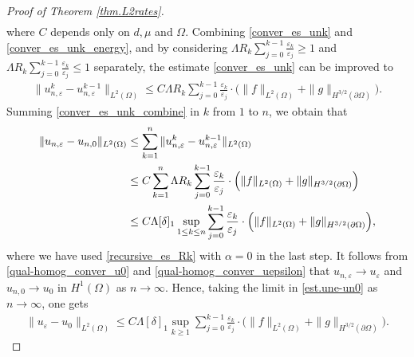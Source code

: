 \documentclass[reqno,12pt]{amsart} %
\theoremstyle{definition}
\theoremstyle{remark}
\numberwithin{equation}{section}
\newcommand{\e}{\varepsilon}
\begin{document}
\begin{proof}[Proof of Theorem \ref{thm.L2rates}]
\begin{align}
\end{align}
where $C$ depends only on $d, \mu $ and $\Omega$. Combining \eqref{conver_es_unk} and \eqref{conver_es_unk_energy}, and by considering $\Lambda R_k\sum_{j=0}^{k-1}\frac{\varepsilon_k}{\varepsilon_j}\geq 1$ and $\Lambda R_k\sum_{j=0}^{k-1}\frac{\varepsilon_k}{\varepsilon_j}\leq 1$ separately, the estimate \eqref{conver_es_unk} can be improved to
\begin{align}\label{conver_es_unk_combine}
  \|u_{n, \varepsilon}^k-u_{n, \varepsilon}^{k-1}\|_{L^2(\Omega)}\leq C\Lambda R_k\sum_{j=0}^{k-1}\frac{\varepsilon_k}{\varepsilon_j}\cdot\Big(\|f\|_{L^2(\Omega)}+\|g\|_{H^{3/2}(\partial\Omega)}\Big).
\end{align}
Summing \eqref{conver_es_unk_combine} in $k$ from $1$ to $n$, we obtain that
\begin{equation}\label{est.une-un0}
\aligned
  \|u_{n,\varepsilon}-u_{n, 0}\|_{L^2(\Omega)}&\leq \sum_{k=1}^n\|u_{n, \varepsilon}^k-u_{n, \varepsilon}^{k-1}\|_{L^2(\Omega)}\\&\leq C\sum_{k=1}^n \Lambda R_k\sum_{j=0}^{k-1}\frac{\varepsilon_k}{\varepsilon_j}\cdot\Big(\|f\|_{L^2(\Omega)}+\|g\|_{H^{3/2}(\partial\Omega)}\Big)\\&\leq C \Lambda[\delta]_1\sup_{1\le k\le n} \sum_{j = 0}^{k-1} \frac{\e_k}{\e_j}\cdot \Big(\|f\|_{L^2(\Omega)}+\|g\|_{H^{3/2}(\partial\Omega)}\Big),
  \endaligned
\end{equation}
where we have used \eqref{recursive_es_Rk} with $\alpha = 0$ in the last step. It follows from \eqref{qual-homog_conver_u0} and \eqref{qual-homog_conver_uepsilon} that $u_{n, \varepsilon}\rightarrow u_\varepsilon$ and $u_{n, 0}\rightarrow u_0$ in $H^1(\Omega)$ as $n\rightarrow\infty$. Hence, taking the limit in \eqref{est.une-un0} as $n\to \infty$, one gets
\begin{align}\label{es_rate_sumratio}
  \|u_\varepsilon-u_0\|_{L^2(\Omega)}\leq C\Lambda[\delta]_1\sup_{k\geq 1} \sum_{j = 0}^{k-1} \frac{\e_k}{\e_j}\cdot\Big(\|f\|_{L^2(\Omega)}+\|g\|_{H^{3/2}(\partial\Omega)}\Big).
\end{align}


\end{proof}
\end{document}
